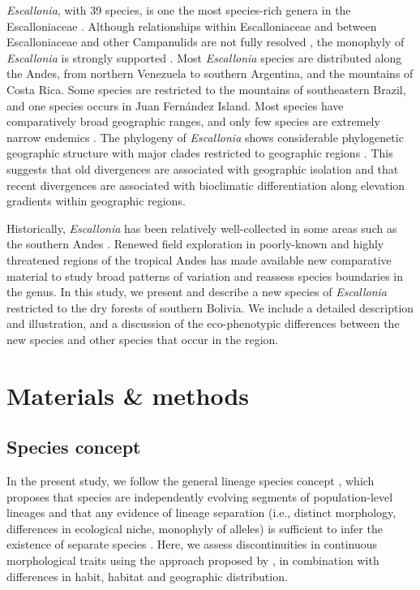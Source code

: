 \documentclass[fleqn,10pt,lineno]{wlpeerj} %
\begin{document}
\emph{Escallonia}, with 39 species, is one the most species-rich genera in the Escalloniaceae \citep{APG:2016tv}. Although relationships within Escalloniaceae and between Escalloniaceae and other Campanulids are not fully resolved \citep{Tank:2010ej,Beaulieu:2018bc}, the monophyly of \emph{Escallonia} is strongly supported \citep{Sede:2013hl,Zapata:2013dk}. Most \emph{Escallonia} species are distributed along the Andes, from northern Venezuela to southern Argentina, and the mountains of Costa Rica. Some species are restricted to the mountains of southeastern Brazil, and one species occurs in Juan Fernández Island. Most species have comparatively broad geographic ranges, and only few species are extremely narrow endemics \citep{Sleumer:1968ts}. The phylogeny of \emph{Escallonia} shows considerable phylogenetic geographic structure with major clades restricted to geographic regions \citep{Zapata:2013dk}. This suggests that old divergences are associated with geographic isolation and that recent divergences are associated with bioclimatic differentiation along elevation gradients within geographic regions.

Historically, \emph{Escallonia} has been relatively well-collected in some areas such as the southern Andes \citep{Kausel:1953uc,Sleumer:1968ts,Sede:2018cb}. Renewed field exploration in poorly-known and highly threatened regions of the tropical Andes has made available new comparative material to study broad patterns of variation and reassess species boundaries in the genus. In this study, we present and describe a new species of \emph{Escallonia} restricted to the dry forests of southern Bolivia. We include a detailed description and illustration, and a discussion of the eco-phenotypic differences between the new species and other species that occur in the region.

\section*{Materials \& methods}

\subsection*{Species concept}

In the present study, we follow the general lineage species concept \citep{deQueiroz:1998te}, which proposes that species are independently evolving segments of population-level lineages and that any evidence of lineage separation (i.e., distinct morphology, differences in ecological niche, monophyly of alleles) is sufficient to infer the existence of separate species \citep{deQueiroz:2007di}. Here, we assess discontinuities in continuous morphological traits using the approach proposed by \cite{Zapata:2012it}, in combination with differences in habit, habitat and geographic distribution.
\end{document}
